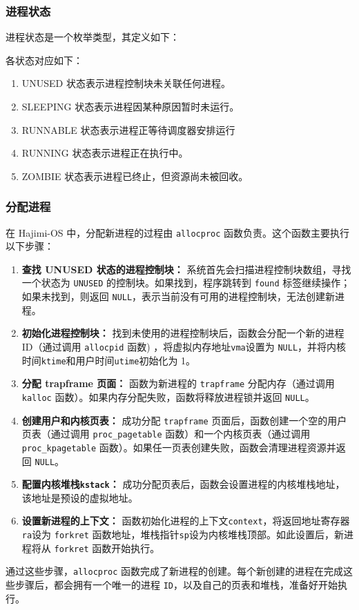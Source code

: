 \documentclass[UTF8]{article}
\begin{document}
\subsubsection{进程状态}
进程状态是一个枚举类型，其定义如下：

各状态对应如下：
\begin{enumerate}[label=\textbf{\arabic*}., wide, labelwidth=!, labelindent=0pt]
  \item UNUSED 状态表示进程控制块未关联任何进程。
  \item SLEEPING 状态表示进程因某种原因暂时未运行。
  \item RUNNABLE 状态表示进程正等待调度器安排运行
  \item RUNNING 状态表示进程正在执行中。
  \item ZOMBIE 状态表示进程已终止，但资源尚未被回收。
\end{enumerate}
\subsubsection{分配进程}
在 Hajimi-OS 中，分配新进程的过程由 \texttt{allocproc} 函数负责。这个函数主要执行以下步骤：
\begin{enumerate}[label=\textbf{\arabic*}., wide, labelwidth=!, labelindent=0pt]
  \item \textbf{查找 UNUSED 状态的进程控制块：} 系统首先会扫描进程控制块数组，寻找一个状态为 \texttt{UNUSED} 的控制块。如果找到，程序跳转到 \texttt{found} 标签继续操作；如果未找到，则返回 \texttt{NULL}，表示当前没有可用的进程控制块，无法创建新进程。
  \item \textbf{初始化进程控制块：} 找到未使用的进程控制块后，函数会分配一个新的进程 ID（通过调用 \texttt{allocpid} 函数) ，将虚拟内存地址\texttt{vma}设置为 \texttt{NULL}，并将内核时间\texttt{ktime}和用户时间\texttt{utime}初始化为 1。
  \item \textbf{分配 trapframe 页面：} 函数为新进程的 \texttt{trapframe} 分配内存（通过调用 \texttt{kalloc} 函数）。如果内存分配失败，函数将释放进程锁并返回 \texttt{NULL}。
  \item \textbf{创建用户和内核页表：} 成功分配 \texttt{trapframe} 页面后，函数创建一个空的用户页表（通过调用 \texttt{proc\_pagetable} 函数）和一个内核页表（通过调用 \texttt{proc\_kpagetable} 函数）。如果任一页表创建失败，函数会清理进程资源并返回 \texttt{NULL}。
  \item \textbf{配置内核堆栈\texttt{kstack}：} 成功分配页表后，函数会设置进程的内核堆栈地址，该地址是预设的虚拟地址。
  \item \textbf{设置新进程的上下文：} 函数初始化进程的上下文\texttt{context}，将返回地址寄存器\texttt{ra}设为 \texttt{forkret} 函数地址，堆栈指针\texttt{sp}设为内核堆栈顶部。如此设置后，新进程将从 \texttt{forkret} 函数开始执行。
\end{enumerate}
通过这些步骤，\texttt{allocproc} 函数完成了新进程的创建。每个新创建的进程在完成这些步骤后，都会拥有一个唯一的进程 \texttt{ID}，以及自己的页表和堆栈，准备好开始执行。
\end{document}

